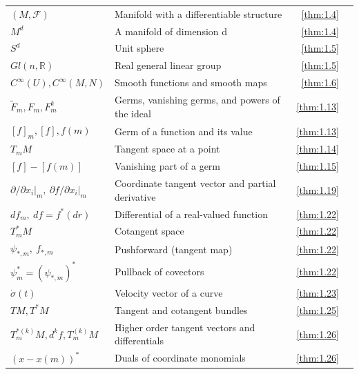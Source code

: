 {\begin{longtable}{@{}>{\raggedright\arraybackslash}p{.39\linewidth}>{\raggedright\arraybackslash}p{.39\linewidth}r r@{}}
$(M,\allowbreak \mathcal{F})$ & Manifold with a differentiable structure & \ref{thm:1.4} & \pageref{thm:1.4} \\
$M^{d}$ & A manifold of dimension d & \ref{thm:1.4} & \pageref{thm:1.4} \\
$S^{d}$ & Unit sphere & \ref{thm:1.5} & \pageref{thm:1.5} \\
$Gl(n,\allowbreak \mathbb R)$ & Real general linear group & \ref{thm:1.5} & \pageref{thm:1.5} \\
$C^{\infty}(U),\allowbreak  C^{\infty}(M,\allowbreak N)$ & Smooth functions and smooth maps & \ref{thm:1.6} & \pageref{thm:1.6} \\
$\tilde{F}_{m},\allowbreak  F_{m},\allowbreak  F_{m}^{k}$ & Germs, vanishing germs, and powers of the ideal & \ref{thm:1.13} & \pageref{thm:1.13} \\
$[f]_m,\allowbreak  [f],\allowbreak  f(m)$ & Germ of a function and its value & \ref{thm:1.13} & \pageref{thm:1.13} \\
$T_{m} M$ & Tangent space at a point & \ref{thm:1.14} & \pageref{thm:1.14} \\
$[f]-[f(m)]$ & Vanishing part of a germ & \ref{thm:1.15} & \pageref{thm:1.15} \\
$\left.\partial/\partial x_i\right|_m,\allowbreak \ \left.\partial f/\partial x_i\right|_m$ & Coordinate tangent vector and partial derivative & \ref{thm:1.19} & \pageref{thm:1.19} \\
$df_m,\allowbreak \ df=f^*(dr)$ & Differential of a real-valued function & \ref{thm:1.22} & \pageref{thm:1.22} \\
$T_{m}^{*} M$ & Cotangent space & \ref{thm:1.22} & \pageref{thm:1.22} \\
$\psi_{*,\allowbreak m},\allowbreak \ f_{*,\allowbreak m}$ & Pushforward (tangent map) & \ref{thm:1.22} & \pageref{thm:1.22} \\
$\psi_m^*=(\psi_{*,\allowbreak m})^*$ & Pullback of covectors & \ref{thm:1.22} & \pageref{thm:1.22} \\
$\dot{\sigma}(t)$ & Velocity vector of a curve & \ref{thm:1.23} & \pageref{thm:1.23} \\
$TM,\allowbreak  T^{*}M$ & Tangent and cotangent bundles & \ref{thm:1.25} & \pageref{thm:1.25} \\
$T_{m}^{*(k)} M,\allowbreak  d^{k}f,\allowbreak  T_{m}^{(k)} M$ & Higher order tangent vectors and differentials & \ref{thm:1.26} & \pageref{thm:1.26} \\
$(x-x(m))^{*}$ & Duals of coordinate monomials & \ref{thm:1.26} & \pageref{thm:1.26} \\

\end{longtable}}
